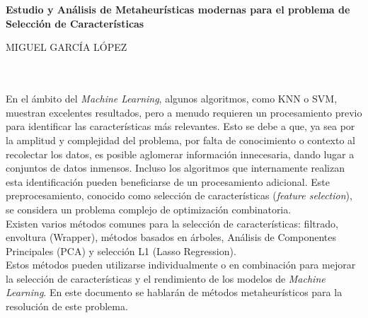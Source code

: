 \chapter*{}






\cleardoublepage
\thispagestyle{empty}

\begin{center}
       {\large\bfseries Estudio y Análisis de Metaheurísticas modernas para el problema de Selección de Características}\\
\end{center}
\begin{center}
       MIGUEL GARCÍA LÓPEZ\\
\end{center}

\\

\vspace{0.7cm}
\\

En el ámbito del \textit{Machine Learning}, algunos algoritmos, como KNN o SVM, muestran excelentes resultados, pero a menudo requieren un procesamiento previo para identificar las características más relevantes. Esto se debe a que, ya sea por la amplitud y complejidad del problema, por falta de conocimiento o contexto al recolectar los datos, es posible aglomerar información innecesaria, dando lugar a conjuntos de datos inmensos. Incluso los algoritmos que internamente realizan esta identificación pueden beneficiarse de un procesamiento adicional. Este preprocesamiento, conocido como selección de características (\textit{feature selection}), se considera un problema complejo de optimización combinatoria.\\[6pt]

Existen varios métodos comunes para la selección de características: filtrado, envoltura (Wrapper), métodos basados en árboles, Análisis de Componentes Principales (PCA) y selección L1 (Lasso Regression).\\[6pt]

Estos métodos pueden utilizarse individualmente o en combinación para mejorar la selección de características y el rendimiento de los modelos de \textit{Machine Learning}. En este documento se hablarán de métodos metaheurísticos para la resolución de este problema.\\[6pt]

